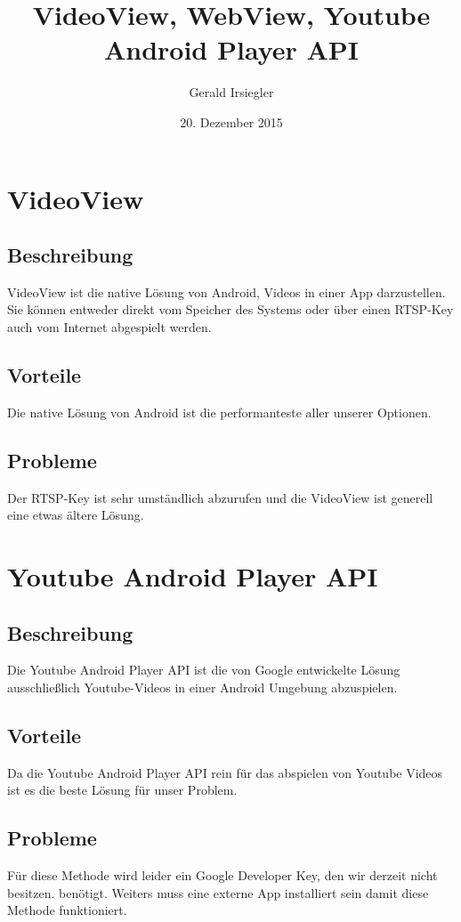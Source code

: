 \documentclass[article,10pt]{scrartcl}
\title{VideoView, WebView, Youtube Android Player API}
\author{Gerald Irsiegler}
\date{20. Dezember 2015}
\begin{document}
\maketitle
\tableofcontents

\newpage

\section{VideoView}
\subsection{Beschreibung}
VideoView ist die native Lösung von Android, Videos in einer App darzustellen. Sie können entweder direkt vom Speicher des Systems oder über einen RTSP-Key auch vom Internet  abgespielt werden.
\subsection{Vorteile}
Die native Lösung von Android ist die performanteste aller unserer Optionen.
\subsection{Probleme}
Der RTSP-Key ist sehr umständlich abzurufen und die VideoView ist generell eine etwas ältere Lösung.

\section{Youtube Android Player API}
\subsection{Beschreibung}
Die Youtube Android Player API ist die von Google entwickelte Lösung ausschließlich Youtube-Videos in einer Android Umgebung abzuspielen.
\subsection{Vorteile}
Da die Youtube Android Player API rein für das abspielen von Youtube Videos ist es die beste Lösung für unser Problem.
\subsection{Probleme}
Für diese Methode wird leider ein Google Developer Key, den wir derzeit nicht besitzen. benötigt. Weiters muss eine externe App installiert sein damit diese Methode funktioniert.
\newpage
\end{document}
